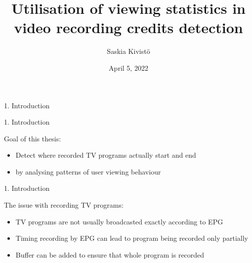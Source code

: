 \documentclass[first=orange,second=blue,logo=blueque]{aaltoslides}
\title{Utilisation of viewing statistics in video recording credits detection}
\author[S. Kivistö]{Saskia Kivistö}
\institute[ICS]{Puhepaja 2}
\date{April 5, 2022}
\begin{document}

\aaltotitleframe


\begin{frame}{1. Introduction}
\end{frame}


\begin{frame}{1. Introduction}
    \begin{block}{{\color{black}Goal of this thesis:}}
        \begin{itemize}
        \item Detect where recorded TV programs actually start and end
        \item by analysing patterns of user viewing behaviour
        \end{itemize}
    \end{block}
\end{frame}


\begin{frame}{1. Introduction}
    \begin{block}{{\color{black}The issue with recording TV programs:}}
        \begin{itemize}
            \item TV programs are not usually broadcasted exactly according to EPG
            \item Timing recording by EPG can lead to program being recorded only partially
            \item Buffer can be added to ensure that whole program is recorded
        \end{itemize}
    \end{block}
\end{frame}
    
\end{document}
